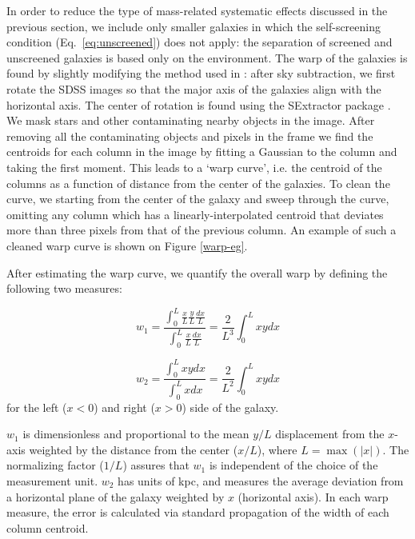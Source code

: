 \documentclass{emulateapj}
\begin{document}
In order to reduce the type of mass-related systematic effects discussed in
the previous  section, we include only smaller galaxies in which the
self-screening condition (Eq.\ \ref{eq:unscreened}) does not apply: the
separation of screened and
unscreened galaxies is based only on the environment.
The warp of the galaxies is found by slightly modifying the method used
in \citet{jim97}: after sky subtraction, we first rotate the SDSS images
so that the major axis of the galaxies align with the horizontal axis.
The center of rotation is found using the SExtractor package \citep{bertin96}.
We mask stars and other contaminating
nearby objects in the image. After removing all the contaminating objects and
pixels in the frame we find the centroids
for each column in the image by fitting a Gaussian to the column and taking the
first moment. This leads to a `warp curve', i.e. the centroid of the
columns as a function of distance from the center of the galaxies.
To clean the curve, we starting from the center of the galaxy and
sweep through the curve, omitting any column which has a linearly-interpolated
centroid that deviates more than three pixels from that of the previous column.
An example of such a cleaned warp curve is shown on Figure \ref{warp-eg}.


After estimating the warp curve, we quantify the overall
warp by defining the following two measures:

\begin{equation}
w_1 =  \frac{\int_0^L \frac{x}{L} \frac{y}{L} \frac{dx}{L}}{\int_0^L
\frac{x}{L}\frac{dx}{L}}=\frac{2}{L^3} \int_0^L x y dx
\label{warp-param} 
\end{equation}

\begin{equation}
w_2 = \frac{\int_0^L{x y dx}}{\int_0^L{x dx}}=\frac{2}{L^2} \int_0^L x y dx
\label{warp-param2} 
\end{equation} 
for the left ($x < 0$) and right ($x > 0$) side of the galaxy.

$w_1$ is dimensionless and proportional to the mean $y/L$ displacement from the
$x$-axis weighted by the distance from the center ($x/L$),
where $L = \max(|x|)$.
The normalizing factor ($1/L$) assures that $w_1$ is independent
of the choice of the measurement unit.
$w_2$ has units of kpc, and measures the average deviation from a
horizontal plane of the galaxy weighted by $x$ (horizontal axis).
In each warp measure, the error is calculated via standard propagation
of the width of each column centroid.
\end{document}
